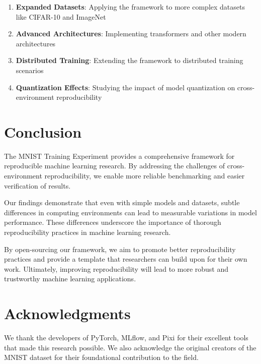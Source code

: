 \documentclass[
]{article}
\providecommand{\tightlist}{%
  \setlength{\itemsep}{0pt}\setlength{\parskip}{0pt}}\usepackage{longtable,booktabs,array}
\begin{document}
\begin{enumerate}
\def\labelenumi{\arabic{enumi}.}
\tightlist
\item
  \textbf{Expanded Datasets}: Applying the framework to more complex
  datasets like CIFAR-10 and ImageNet
\item
  \textbf{Advanced Architectures}: Implementing transformers and other
  modern architectures
\item
  \textbf{Distributed Training}: Extending the framework to distributed
  training scenarios
\item
  \textbf{Quantization Effects}: Studying the impact of model
  quantization on cross-environment reproducibility
\end{enumerate}

\section{Conclusion}\label{sec-conclusion}

The MNIST Training Experiment provides a comprehensive framework for
reproducible machine learning research. By addressing the challenges of
cross-environment reproducibility, we enable more reliable benchmarking
and easier verification of results.

Our findings demonstrate that even with simple models and datasets,
subtle differences in computing environments can lead to measurable
variations in model performance. These differences underscore the
importance of thorough reproducibility practices in machine learning
research.

By open-sourcing our framework, we aim to promote better reproducibility
practices and provide a template that researchers can build upon for
their own work. Ultimately, improving reproducibility will lead to more
robust and trustworthy machine learning applications.

\section{Acknowledgments}\label{sec-acknowledgments}

We thank the developers of PyTorch, MLflow, and Pixi for their excellent
tools that made this research possible. We also acknowledge the original
creators of the MNIST dataset for their foundational contribution to the
field.
\end{document}
